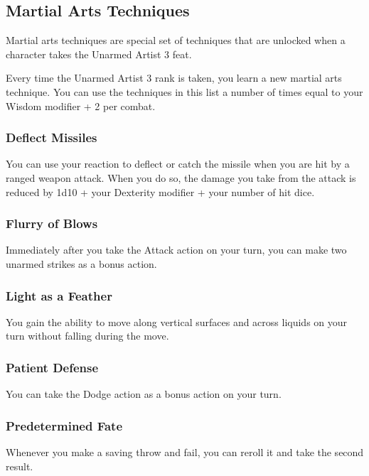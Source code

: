\subsection*{Martial Arts Techniques} \label{tec::martialartstechniques}
Martial arts techniques are special set of techniques that are unlocked when a character takes the Unarmed Artist 3 feat.

Every time the Unarmed Artist 3 rank is taken, you learn a new martial arts technique.
You can use the techniques in this list a number of times equal to your Wisdom modifier + 2 per combat.

\subsubsection{Deflect Missiles} \label{mtec::deflectmissiles}
You can use your reaction to deflect or catch the missile when you are hit by a ranged weapon attack.
When you do so, the damage you take from the attack is reduced by 1d10 + your Dexterity modifier + your number of hit dice.

\subsubsection{Flurry of Blows} \label{mtec::flurryofblows}
Immediately after you take the Attack action on your turn, you can make two unarmed strikes as a bonus action.

\subsubsection{Light as a Feather} \label{mtec::lightasafeather}
You gain the ability to move along vertical surfaces and across liquids on your turn without falling during the move.

\subsubsection{Patient Defense} \label{mtec::patientdefense}
You can take the Dodge action as a bonus action on your turn.

\subsubsection{Predetermined Fate} \label{mtec::predeterminedfate}
Whenever you make a saving throw and fail, you can reroll it and take the second result.

